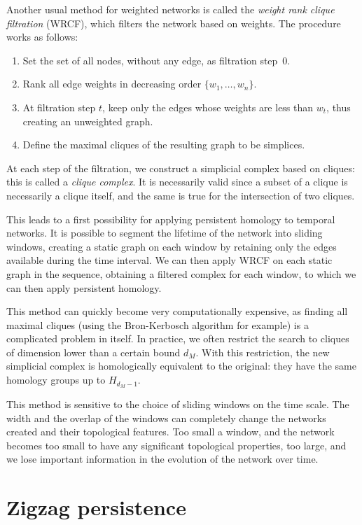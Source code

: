 \documentclass[a4paper,11pt,openany,extrafontsizes]{memoir}
\begin{document}
Another usual method for weighted networks is called the \emph{weight
  rank clique filtration} (WRCF), which filters the network based on
weights. The procedure works as follows:
\begin{enumerate}
\item Set the set of all nodes, without any edge, as filtration
  step~0.
\item Rank all edge weights in decreasing order $\{w_1,\ldots,w_n\}$.
\item At filtration step $t$, keep only the edges whose weights are
  less than $w_t$, thus creating an unweighted graph.
\item Define the maximal cliques of the resulting graph to be
  simplices.
\end{enumerate}

At each step of the filtration, we construct a simplicial complex
based on cliques: this is called a \emph{clique complex}. It is
necessarily valid since a subset of a clique is necessarily a clique
itself, and the same is true for the intersection of two cliques.

This leads to a first possibility for applying persistent homology to
temporal networks. It is possible to segment the lifetime of the
network into sliding windows, creating a static graph on each window
by retaining only the edges available during the time interval. We can
then apply WRCF on each static graph in the sequence, obtaining a
filtered complex for each window, to which we can then apply
persistent homology.

This method can quickly become very computationally expensive, as
finding all maximal cliques (using the Bron-Kerbosch algorithm for
example) is a complicated problem in itself. In practice, we often
restrict the search to cliques of dimension lower than a certain bound
$d_M$. With this restriction, the new simplicial complex is
homologically equivalent to the original: they have the same homology
groups up to $H_{d_M-1}$.

This method is sensitive to the choice of sliding windows on the time
scale. The width and the overlap of the windows can completely change
the networks created and their topological features. Too small a
window, and the network becomes too small to have any significant
topological properties, too large, and we lose important information
in the evolution of the network over time.

\section{Zigzag persistence}%
\label{sec:zigzag-persistence}


\backmatter%

\nocite{*}

%
\label{cha:bibliography}
\end{document}
